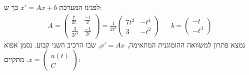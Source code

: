 \documentclass{article}
\begin{document}
לפנינו המערכת $x'=Ax+b$ כך ש:
\begin{align*}
    A=\begin{pmatrix}
          \frac{7}{2t}   & \frac{-t}{2}  \\
          \frac{3}{2t^3} & \frac{-1}{2t}
      \end{pmatrix}=\frac{1}{2t^3}\begin{pmatrix}
                                      7t^2 & -t^4 \\
                                      3    & -t^2
                                  \end{pmatrix} &  & b=\begin{pmatrix}
                                                           -t \\
                                                           -t^3
                                                       \end{pmatrix}
\end{align*}
נמצא פתרון למשוואה ההומוגנית המתאימה, $x'=Ax$, שבו הרכיב השני קבוע. נסמן אפוא $x=\begin{pmatrix}
        u(t) \\
        C
    \end{pmatrix}$. מתקיים:
\end{document}

